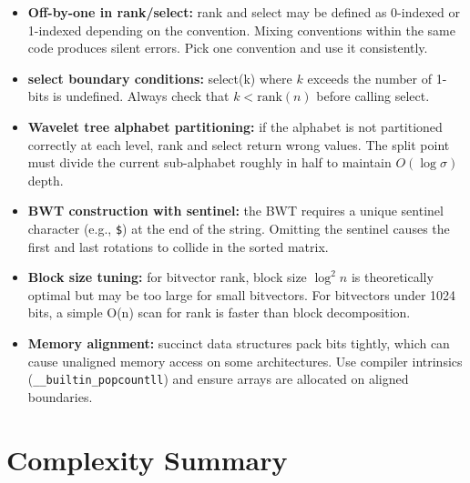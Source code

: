 \begin{itemize}
\item \textbf{Off-by-one in rank/select:} rank and select may be defined as 0-indexed or 1-indexed depending on the convention. Mixing conventions within the same code produces silent errors. Pick one convention and use it consistently.

\item \textbf{select boundary conditions:} select(k) where $k$ exceeds the number of 1-bits is undefined. Always check that $k < \text{rank}(n)$ before calling select.

\item \textbf{Wavelet tree alphabet partitioning:} if the alphabet is not partitioned correctly at each level, rank and select return wrong values. The split point must divide the current sub-alphabet roughly in half to maintain $O(\log \sigma)$ depth.

\item \textbf{BWT construction with sentinel:} the BWT requires a unique sentinel character (e.g., \texttt{\$}) at the end of the string. Omitting the sentinel causes the first and last rotations to collide in the sorted matrix.

\item \textbf{Block size tuning:} for bitvector rank, block size $\log^2 n$ is theoretically optimal but may be too large for small bitvectors. For bitvectors under 1024 bits, a simple O(n) scan for rank is faster than block decomposition.

\item \textbf{Memory alignment:} succinct data structures pack bits tightly, which can cause unaligned memory access on some architectures. Use compiler intrinsics (\texttt{\_\_builtin\_popcountll}) and ensure arrays are allocated on aligned boundaries.
\end{itemize}

\section{Complexity Summary}\label{sec22:complexity-summary}

